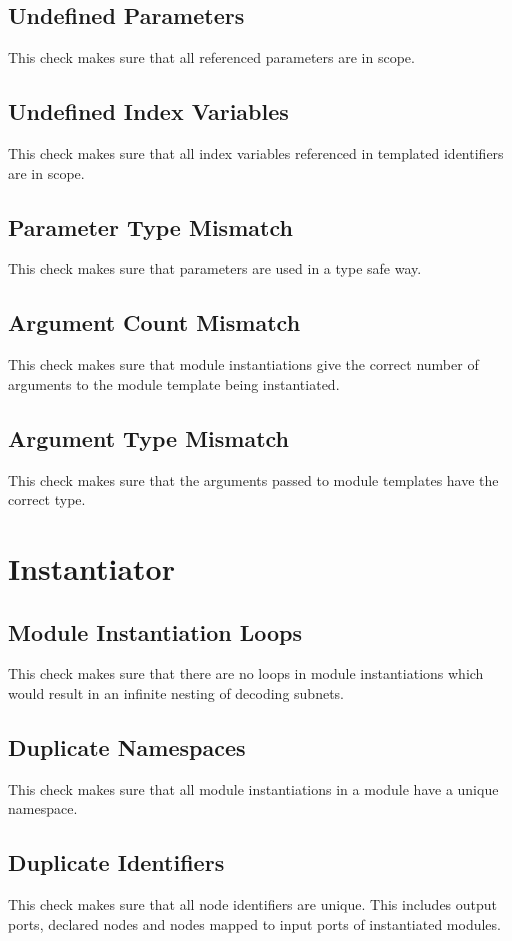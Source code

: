 \documentclass[a4paper,11pt,twoside]{report}
\begin{document}
{{{\subsection{Undefined Parameters}
This check makes sure that all referenced parameters are in scope.

\subsection{Undefined Index Variables}
This check makes sure that all index variables referenced in templated identifiers are in scope. 

\subsection{Parameter Type Mismatch}
This check makes sure that parameters are used in a type safe way.

\subsection{Argument Count Mismatch}
This check makes sure that module instantiations give the correct number of arguments to the module template being instantiated.

\subsection{Argument Type Mismatch}
This check makes sure that the arguments passed to module templates have the correct type.

\section{Instantiator}
\subsection{Module Instantiation Loops}
This check makes sure that there are no loops in module instantiations which would result in an infinite nesting of decoding subnets.

\subsection{Duplicate Namespaces}
This check makes sure that all module instantiations in a module have a unique namespace.

\subsection{Duplicate Identifiers}
This check makes sure that all node identifiers are unique.
This includes output ports, declared nodes and nodes mapped to input ports of instantiated modules.

}}}
\end{document}
